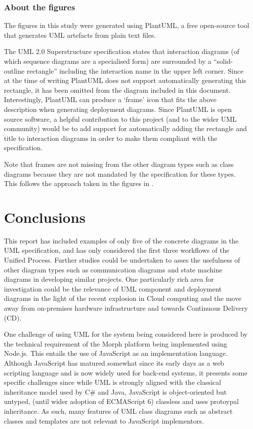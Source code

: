 \documentclass[runningheads,a4paper]{llncs}
\begin{document}
\subsubsection{About the figures}

The figures in this study were generated using PlantUML, a free open-source tool \cite{plantuml} that generates UML artefacts from plain text files.

The UML 2.0 Superstructure specification \cite{omg2011} states that interaction diagrams (of which sequence diagrams are a specialised form) are surrounded by a ``solid-outline rectangle'' including the interaction name in the upper left corner. Since at the time of writing PlantUML does not support automatically generating this rectangle, it has been omitted from the diagram included in this document. Interestingly, PlantUML can produce a `frame' icon that fits the above description when generating deployment diagrams. Since PlantUML is open source software, a helpful contribution to this project (and to the wider UML community) would be to add support for automatically adding the rectangle and title to interaction diagrams in order to make them compliant with the specification.

Note that frames are not missing from the other diagram types such as class diagrams because they are not mandated by the specification for these types. This follows the approach taken in the figures in \cite{arlow}.


\section{Conclusions}

This report has included examples of only five of the concrete diagrams in the UML specification, and has only considered the first three workflows of the Unified Process. Further studies could be undertaken to asses the usefulness of other diagram types such as communication diagrams and state machine diagrams in developing similar projects. One particularly rich area for investigation could be the relevance of UML component and deployment diagrams in the light of the recent explosion in Cloud computing and the move away from on-premises hardware infrastructure and towards Continuous Delivery (CD).

One challenge of using UML for the system being considered here is produced by the technical requirement of the Morph platform being implemented using Node.js. This entails the use of JavaScript as an implementation language. Although JavaScript has matured somewhat since its early days as a web scripting language and is now widely used for back-end systems, it presents some specific challenges since while UML is strongly aligned with the classical inheritance model used by C\# and Java, JavaScript is object-oriented but untyped, (until wider adoption of ECMAScript 6) classless and uses protoypal inheritance. As such, many features of UML class diagrams such as abstract classes and templates are not relevant to JavaScript implementors.
\end{document}
